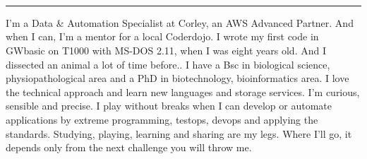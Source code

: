 \documentclass[8pt]{stackoverflow-upgraded-version} %
\begin{document}
\begin{minipage}[t]{0.215\textwidth} %
	\vspace{-\baselineskip} %
	
	\\
	\\
	\\
\end{minipage}



\textcolor{stackoverflow}{\hrule}
\vspace{\baselineskip} %

\begin{minipage}[t]{0.45\textwidth} %
	\vspace{-\baselineskip} %
	I'm a Data \& Automation Specialist at Corley, an AWS Advanced Partner. And when I can, I'm a mentor for a local Coderdojo.
	I wrote my first code in GWbasic on T1000 with MS-DOS 2.11, when I was eight years old. And I dissected an animal a lot of time before..
	I have a Bsc in biological science, physiopathological area and a PhD in biotechnology, bioinformatics area.
	I love the technical approach and learn new languages and storage services. I'm curious, sensible and precise.
	I play without breaks when I can develop or automate applications by extreme programming, testops, devops and applying the standards.
	Studying, playing, learning and sharing are my legs. Where I'll go, it depends only from the next challenge you will throw me.
	\\
\end{minipage}
\hfill %
\begin{minipage}[t]{0.5\textwidth} %
	\vspace{-26pt} %
	\begin{barchart}{5.5}
	\end{barchart}
	\\
\end{minipage}
\end{document}
